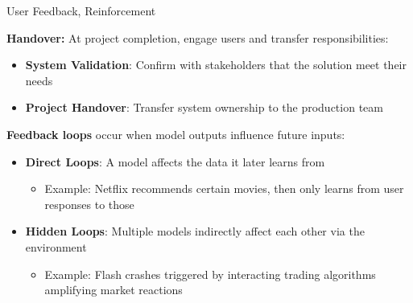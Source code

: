 \documentclass[10pt,compress,t,notes=noshow, xcolor=table]{beamer}
\begin{document}
\begin{frame}{User Feedback, Reinforcement}
\label{user-feedback-and-acceptance}


\textbf{Handover:} At project completion, engage users and transfer responsibilities:

\begin{itemize}
  \item \textbf{System Validation}: Confirm with stakeholders that the solution meet their needs
  \item \textbf{Project Handover}: Transfer system ownership to the production team
\end{itemize}

\textbf{Feedback loops} occur when model outputs influence future inputs:

\begin{itemize}
  \item \textbf{Direct Loops}: A model affects the data it later learns from
    \begin{itemize}
      \item Example: Netflix recommends certain movies, then only learns from user responses to those
    \end{itemize}
  \item \textbf{Hidden Loops}: Multiple models indirectly affect each other via the environment
    \begin{itemize}
      \item Example: Flash crashes triggered by interacting trading algorithms amplifying market reactions
    \end{itemize}
\end{itemize}
\end{frame}


\endlecture
\end{document}

